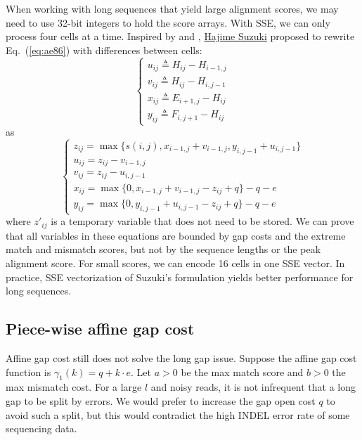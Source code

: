 \documentclass{bioinfo}
\begin{document}
When working with long sequences that yield large alignment scores,
we may need to use 32-bit integers to hold the score arrays. With SSE, we can
only process four cells at a time. Inspired by \citet{Myers:1999aa} and
\citet{Loving:2014aa}, \href{https://github.com/ocxtal}{Hajime Suzuki} proposed
to rewrite Eq.~(\ref{eq:ae86}) with differences between cells:
\begin{equation}
\left\{\begin{array}{l}
u_{ij}\triangleq H_{ij}-H_{i-1,j}\\
v_{ij}\triangleq H_{ij}-H_{i,j-1}\\
x_{ij}\triangleq E_{i+1,j}-H_{ij}\\
y_{ij}\triangleq F_{i,j+1}-H_{ij}
\end{array}\right.
\end{equation}
as
\begin{equation}\label{eq:suzuki}
\left\{\begin{array}{l}
z_{ij}=\max\{s(i,j),x_{i-1,j}+v_{i-1,j},y_{i,j-1}+u_{i,j-1}\}\\
u_{ij}=z_{ij}-v_{i-1,j}\\
v_{ij}=z_{ij}-u_{i,j-1}\\
x_{ij}=\max\{0,x_{i-1,j}+v_{i-1,j}-z_{ij}+q\}-q-e\\
y_{ij}=\max\{0,y_{i,j-1}+u_{i,j-1}-z_{ij}+q\}-q-e
\end{array}\right.
\end{equation}
where $z'_{ij}$ is a temporary variable that does not need to be stored.
We can prove that all variables in these equations are bounded by gap costs and
the extreme match and mismatch scores, but not by the sequence lengths or the
peak alignment score. For small scores, we can encode 16 cells in one SSE
vector. In practice, SSE vectorization of Suzuki's formulation yields better
performance for long sequences.

\subsection{Piece-wise affine gap cost}

Affine gap cost still does not solve the long gap issue. Suppose the affine gap
cost function is $\gamma_1(k)=q+k\cdot e$. Let $a>0$ be the max match score and
$b>0$ the max mismatch cost.
For a large $l$
and noisy reads, it is not infrequent that a long gap to be split by errors. We
would prefer to increase the gap open cost $q$ to avoid such a split, but this
would contradict the high INDEL error rate of some sequencing data.
\end{document}
